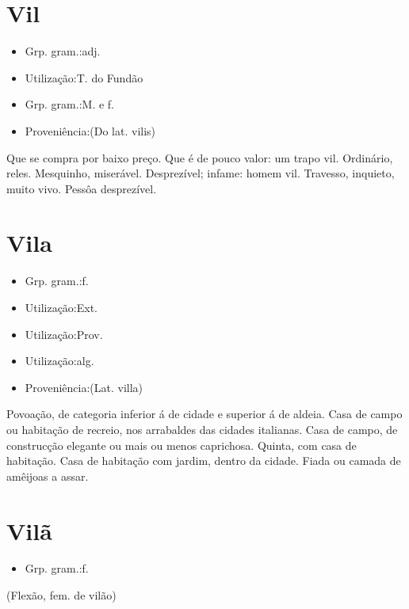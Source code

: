\documentclass{article}
\begin{document}
\section{Vil}
\begin{itemize}
\item {Grp. gram.:adj.}
\end{itemize}
\begin{itemize}
\item {Utilização:T. do Fundão}
\end{itemize}
\begin{itemize}
\item {Grp. gram.:M.  e  f.}
\end{itemize}
\begin{itemize}
\item {Proveniência:(Do lat. \textunderscore vilis\textunderscore )}
\end{itemize}
Que se compra por baixo preço.
Que é de pouco valor: \textunderscore um trapo vil\textunderscore .
Ordinário, reles.
Mesquinho, miserável.
Desprezível; infame: \textunderscore homem vil\textunderscore .
Travesso, inquieto, muito vivo.
Pessôa desprezível.
\section{Vila}
\begin{itemize}
\item {Grp. gram.:f.}
\end{itemize}
\begin{itemize}
\item {Utilização:Ext.}
\end{itemize}
\begin{itemize}
\item {Utilização:Prov.}
\end{itemize}
\begin{itemize}
\item {Utilização:alg.}
\end{itemize}
\begin{itemize}
\item {Proveniência:(Lat. \textunderscore villa\textunderscore )}
\end{itemize}
Povoação, de categoria inferior á de cidade e superior á de aldeia.
Casa de campo ou habitação de recreio, nos arrabaldes das cidades italianas.
Casa de campo, de construcção elegante ou mais ou menos caprichosa.
Quinta, com casa de habitação.
Casa de habitação com jardim, dentro da cidade.
Fiada ou camada de amêijoas a assar.
\section{Vilã}
\begin{itemize}
\item {Grp. gram.:f.}
\end{itemize}
(Flexão, fem. de \textunderscore vilão\textunderscore )
\end{document}
